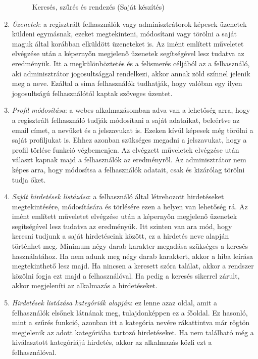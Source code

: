 \documentclass[]{thesis-ekf}
\theoremstyle{definition}
\theoremstyle{remark}
\begin{document}
\begin{enumerate}
\begin{figure}[ht!]
				\caption{Keresés, szűrés és rendezés (Saját készítés)} 
				\label{kereses-szures-muvelet}
			\end{figure}
			\item \emph{Üzenetek}: a regisztrált felhasználók vagy adminisztrátorok képesek üzenetek küldeni egymásnak, ezeket megtekinteni, módosítani vagy törölni a saját maguk által korábban elküldött üzeneteket is. Az imént említett műveletet elvégzése után a képernyőn megjelenő üzenetek segítségével lesz tudatva az eredményük. Itt a megkülönböztetés és a felismerés céljából az a felhasználó, aki adminisztrátor jogosultsággal rendelkezi, akkor annak zöld színnel jelenik meg a neve. Ezáltal a sima felhasználók tudhatják, hogy valóban egy ilyen jogosultságú felhasználótól kaptak szöveges üzentet.
			\item \emph{Profil módosítása}: a webes alkalmazásomban adva van a lehetőség arra, hogy a regisztrált felhasználó tudják módosítani a saját adataikat, beleértve az email címet, a nevüket és a jelszavukat is. Ezeken kívül képesek még törölni a saját profiljukat is. Ehhez azonban szükséges megadni a jelszavukat, hogy a profil törlése funkció végbemenjen. Az elvégzett műveletek elvégzése után választ kapnak majd a felhasználók az eredményről. Az adminisztrátor nem képes arra, hogy módosítsa a felhasználók adatait, csak és kizárólag törölni tudja őket.
			\item \emph{Saját hirdetések listázása}: a felhasználó által létrehozott hirdetéseket megtekintésére, módosítására és törlésére ezen a helyen van lehetőség rá. Az imént említett műveletet elvégzése után a képernyőn megjelenő üzenetek segítségével lesz tudatva az eredményük. Itt szinten van ara mód, hogy keresni tudjunk a saját hirdetéseink között, ez a hirdetés neve alapján történhet meg. Minimum négy darab karakter megadása szükséges a keresés használatához. Ha nem adunk meg négy darab karaktert, akkor a hiba leírása megtekinthető lesz majd. Ha nincsen a keresett szóra találat, akkor a rendszer közölni fogja ezt majd a felhasználóval. Ha pedig a keresés sikerrel zárult, akkor megjeleníti az alkalmazás a hirdetéseket.
			\item \emph{Hirdetések listázása kategóriák alapján}: ez lenne azaz oldal, amit a felhasználók elsőnek látnának meg, tulajdonképpen ez a főoldal. Ez hasonló, mint a szűrés funkció, azonban itt a kategória nevére rákattintva már rögtön megjelenik az adott kategóriába tartozó hirdetéseket. Ha nem található még a kiválasztott kategóriájú hirdetés, akkor az alkalmazás közli ezt a felhasználóval.
		\end{enumerate}
	
\end{document}
